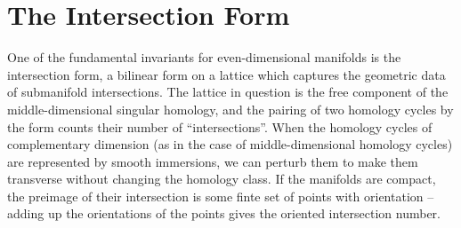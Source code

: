 \pagebreak
\section{The Intersection Form}\label{sec:intersection-form}

One of the fundamental invariants for even-dimensional manifolds is the intersection form, a bilinear form on a lattice which captures the geometric data of submanifold intersections. The lattice in question is the free component of the middle-dimensional singular homology, and the pairing of two homology cycles by the form counts their number of ``intersections''. When the homology cycles of complementary dimension (as in the case of middle-dimensional homology cycles) are represented by smooth immersions, we can perturb them to make them transverse without changing the homology class. If the manifolds are compact, the preimage of their intersection is some finte set of points with orientation -- adding up the orientations of the points gives the oriented intersection number.

